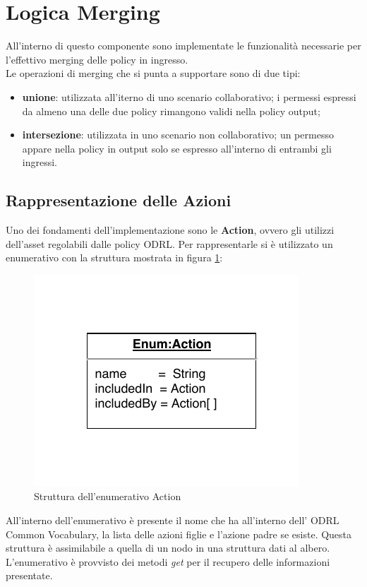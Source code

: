 \documentclass[12pt,a4paper,twoside]{book}
\begin{document}
\section{Logica Merging}
All'interno di questo componente sono implementate le funzionalità necessarie per l'effettivo merging delle policy in ingresso.\\
Le operazioni di merging che si punta a supportare sono di due tipi:
\begin{itemize}
\item \textbf{unione}: utilizzata all'iterno di uno scenario collaborativo; i permessi espressi da almeno una delle due policy rimangono validi nella policy output;
\item \textbf{intersezione}: utilizzata in uno scenario non collaborativo; un permesso appare nella policy in output solo se espresso all'interno di entrambi gli ingressi.
\end{itemize}
\subsection{Rappresentazione delle Azioni}\label{enumAction}
Uno dei fondamenti dell'implementazione sono le \textbf{Action}, ovvero gli utilizzi dell'asset regolabili dalle policy ODRL. Per rappresentarle si è utilizzato un enumerativo con la struttura mostrata in figura \ref{imgActionEnum}:
\begin{figure}[H]
\centering
\includegraphics[scale=1.00]{../immagini/enumAction}
\caption{Struttura dell'enumerativo Action}
\label{imgActionEnum}
\end{figure}
All'interno dell'enumerativo è presente il nome che ha all'interno dell' ODRL Common Vocabulary, la lista delle azioni figlie e l'azione padre se esiste. Questa struttura è assimilabile a quella di un nodo in una struttura dati al albero. L'enumerativo è provvisto dei metodi \textit{get} per il recupero delle informazioni presentate.
\end{document}
